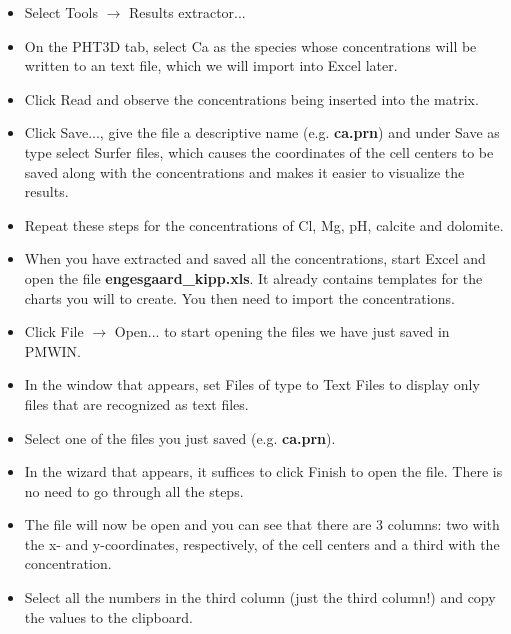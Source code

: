 \begin{itemize}

\item Select Tools $\rightarrow$ Results extractor...

\item On the PHT3D tab, select Ca as the species whose concentrations will be written to an text file, which we will import into Excel later.

\item Click Read and observe the concentrations being inserted into the matrix.

\item Click Save..., give the file a descriptive name (e.g. {\color{red} \textbf{ca.prn}}) and under Save as type select Surfer files, which causes the coordinates of the cell centers to be saved along with the concentrations and makes it easier to visualize the results.

\item Repeat these steps for the concentrations of Cl, Mg, pH, calcite and dolomite.

\item When you have extracted and saved all the concentrations, start Excel and open the file {\color{red} \textbf{engesgaard\_kipp.xls}}. It already contains templates for the charts you will to create. You then need to import the concentrations.

\item Click File $\rightarrow$ Open... to start opening the files we have just saved in PMWIN.

\item In the window that appears, set Files of type to Text Files to display only files that are recognized as text files. 

\item Select one of the files you just saved (e.g. {\color{red} \textbf{ca.prn}}).

\item In the wizard that appears, it suffices to click Finish to open the file. There is no need to go through all the steps.

\item The file will now be open and you can see that there are 3 columns: two with the x- and y-coordinates, respectively, of the cell centers and a third with the concentration.

\item Select all the numbers in the third column (just the third column!) and copy the values to the clipboard.


\end{itemize}
